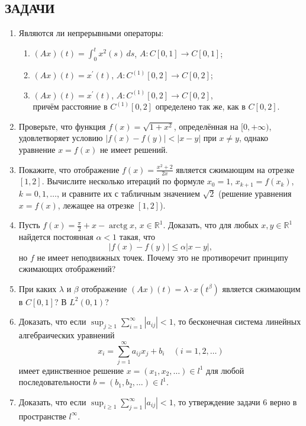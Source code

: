 \documentclass[12pt,a4paper]{article}
\begin{document}
\subsection*{ЗАДАЧИ}
\begin{enumerate}
\item Являются ли непрерывными операторы:
\begin{enumerate}[label=\alph*)]
\item $(Ax)(t)=\int_{0}^{t}x^{2}(s) \, ds$, $A:C[0,1]\rightarrow C[0,1]$;
\item $(Ax)(t)=x^{\prime}(t)$, $A:C^{(1)}[0,2]\rightarrow C[0,2]$;
\item $(Ax)(t)=x^{\prime}(t)$, $A:C^{(1)}[0,2]\rightarrow C[0,2]$, \\ причём расстояние в $C^{(1)}[0,2]$ определено так же, как в $C[0,2]$.
\end{enumerate}

\item Проверьте, что функция $f(x)=\sqrt{1+x^{2}}$, определённая на $[0, +\infty)$, удовлетворяет условию $|f(x)-f(y)|<|x-y|$ при $x\ne y$, однако уравнение $x=f(x)$ не имеет решений.

\item Покажите, что отображение $f(x)=\frac{x^{2}+2}{2x}$ является сжимающим на отрезке $[1, 2]$. Вычислите несколько итераций по формуле $x_{0}=1$, $x_{k+1}=f(x_{k})$, $k=0,1,\dots$, и сравните их с табличным значением $\sqrt{2}$ (решение уравнения $x=f(x)$, лежащее на отрезке $[1,2]$).

\item Пусть $f(x)=\frac{\pi}{2}+x-\operatorname{arctg} x$, $x\in\mathbb{R}^{1}$. Доказать, что для любых $x, y\in\mathbb{R}^{1}$ найдется постоянная $\alpha<1$ такая, что
$$|f(x)-f(y)|\le\alpha|x-y|,$$
но $f$ не имеет неподвижных точек. Почему это не противоречит принципу сжимающих отображений?

\item При каких $\lambda$ и $\beta$ отображение $(Ax)(t)=\lambda\cdot x(t^{\beta})$ является сжимающим в $C[0,1]$? В $L^{2}(0,1)$?

\item Доказать, что если $\sup_{j\ge1}\sum_{i=1}^{\infty}|a_{ij}|<1$, то бесконечная система линейных алгебраических уравнений
$$x_{i}=\sum_{j=1}^{\infty}a_{ij}x_{j}+b_{i} \quad (i=1,2,\dots)$$
имеет единственное решение $x=(x_{1},x_{2},\dots)\in l^{1}$ для любой последовательности $b=(b_{1},b_{2},\dots)\in l^{1}$.

\item Доказать, что если $\sup_{i\ge1}\sum_{j=1}^{\infty}|a_{ij}|<1$, то утверждение задачи 6 верно в пространстве $l^{\infty}$.


\end{enumerate}
\end{document}
